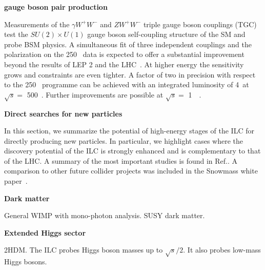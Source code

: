 {\bf gauge boson pair production}


Measurements of the $\gamma W^+W^-$ and $ZW^+W^-$ triple gauge boson couplings (TGC) test the $SU(2) \times U(1)$
gauge boson self-coupling structure of the SM and probe BSM physics. A simultaneous fit of three independent couplings and
the polarization on the 250~\GeV{} data is expected to offer a substantial improvement beyond the results of LEP 2 and the
LHC~\cite{Fujii:2017vwa}. At higher energy the sensitivity grows and constraints are even tighter. A factor of two in
precision\cite{Marchesini:2011aka} with respect to the 250~\GeV{} programme can be achieved with an integrated
luminosity of 4~\invab at $\sqrt{s}=$ 500~\GeV{}. Further improvements are possible at $\sqrt{s}=$ 1~\TeV{}~\cite{Rosca:2016hcq}.



{\bf Direct searches for new particles}

In this section, we summarize the potential of high-energy stages of the ILC for directly producing
new particles. In particular, we highlight cases where the discovery potential of the ILC is strongly enhanced and
is complementary to that of the LHC. A summary of the most important studies is found in Ref.\cite{Fujii:2017ekh}.
A comparison to other future collider projects was included in the Snowmass white paper~\cite{Baer:2013vqa}. 

{\bf Dark matter}

General WIMP with mono-photon analysis. SUSY dark matter.

{\bf Extended Higgs sector}

2HDM.
The ILC probes Higgs boson masses up to $\sqrt{s}/2$. It also probes low-mass Higgs bosons.
